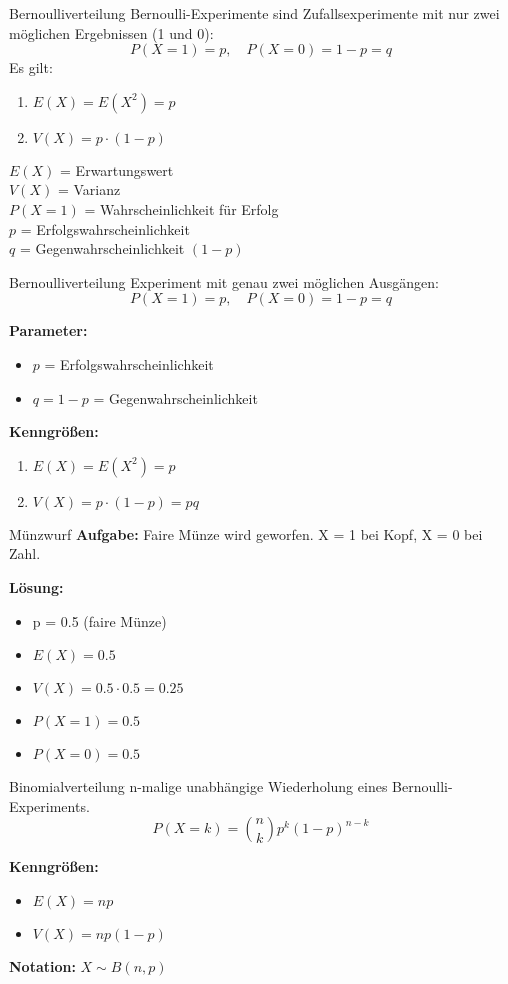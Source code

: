 \begin{definition}{Bernoulliverteilung}
Bernoulli-Experimente sind Zufallsexperimente mit nur zwei möglichen Ergebnissen (1 und 0):
$$
P(X=1)=p, \quad P(X=0)=1-p=q
$$
Es gilt:
\begin{enumerate}
	\item $E(X)=E(X^2)=p$
	\item $V(X)=p \cdot(1-p)$
\end{enumerate}
\hfill \break
$E(X)$ = Erwartungswert\\
$V(X)$ = Varianz\\
$P(X=1)$ = Wahrscheinlichkeit für Erfolg\\
$p$ = Erfolgswahrscheinlichkeit\\
$q$ = Gegenwahrscheinlichkeit $(1-p)$\\
\end{definition}

\begin{definition}{Bernoulliverteilung}
Experiment mit genau zwei möglichen Ausgängen:
$$
P(X=1)=p, \quad P(X=0)=1-p=q
$$

\textbf{Parameter:}
\begin{itemize}
    \item $p$ = Erfolgswahrscheinlichkeit
    \item $q = 1-p$ = Gegenwahrscheinlichkeit
\end{itemize}

\textbf{Kenngrößen:}
\begin{enumerate}
    \item $E(X)=E(X^2)=p$
    \item $V(X)=p \cdot(1-p)=pq$
\end{enumerate}
\end{definition}

\begin{example2}{Münzwurf}
\textbf{Aufgabe:} Faire Münze wird geworfen. X = 1 bei Kopf, X = 0 bei Zahl.

\textbf{Lösung:}
\begin{itemize}
\item p = 0.5 (faire Münze)
\item $E(X) = 0.5$
\item $V(X) = 0.5 \cdot 0.5 = 0.25$
\item $P(X=1) = 0.5$
\item $P(X=0) = 0.5$
\end{itemize}
\end{example2}

\begin{definition}{Binomialverteilung}
n-malige unabhängige Wiederholung eines Bernoulli-Experiments.
$$P(X=k) = \binom{n}{k}p^k(1-p)^{n-k}$$

\textbf{Kenngrößen:}
\begin{itemize}
    \item $E(X) = np$
    \item $V(X) = np(1-p)$
\end{itemize}

\textbf{Notation:} $X \sim B(n,p)$
\end{definition}


